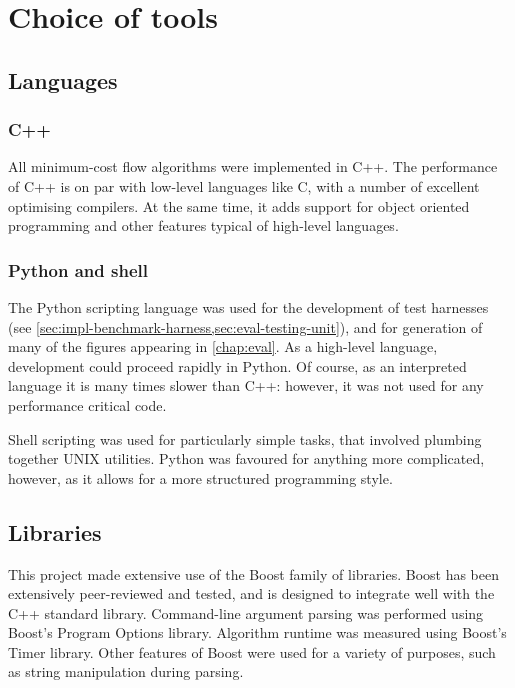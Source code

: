 \section{Choice of tools}

\subsection{Languages} 

\subsubsection{C++}
All minimum-cost flow algorithms were implemented in C++. The performance of C++ is on par with low-level languages like C, with a number of excellent optimising compilers\footnotemark. At the same time, it adds support for object oriented programming and other features typical of high-level languages.

\subsubsection{Python and shell}
The Python scripting language was used for the development of test harnesses (see \cref{sec:impl-benchmark-harness,sec:eval-testing-unit}), and for generation of many of the figures appearing in \cref{chap:eval}. As a high-level language, development could proceed rapidly in Python. Of course, as an interpreted language it is many times slower than C++: however, it was not used for any performance critical code.

Shell scripting was used for particularly simple tasks, that involved plumbing together UNIX utilities. Python was favoured for anything more complicated, however, as it allows for a more structured programming style.

\subsection{Libraries} \label{sec:prep-tools-libraries}

This project made extensive use of the Boost family of libraries. Boost has been extensively peer-reviewed and tested, and is designed to integrate well with the C++ standard library. Command-line argument parsing was performed using Boost's Program Options library. Algorithm runtime was measured using Boost's Timer library. Other features of Boost were used for a variety of purposes, such as string manipulation during parsing.

